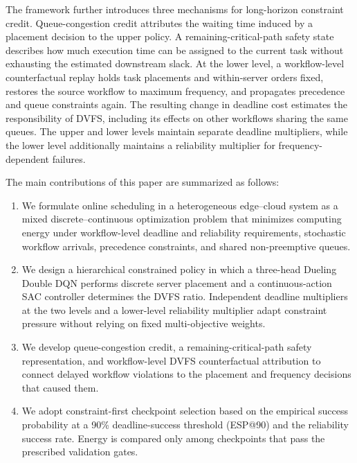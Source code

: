 \documentclass[lettersize,journal]{IEEEtran}
\begin{document}
The framework further introduces three mechanisms for long-horizon constraint
credit. Queue-congestion credit attributes the waiting time induced by a
placement decision to the upper policy. A remaining-critical-path safety state
describes how much execution time can be assigned to the current task without
exhausting the estimated downstream slack. At the lower level, a workflow-level
counterfactual replay holds task placements and within-server orders fixed,
restores the source workflow to maximum frequency, and propagates precedence
and queue constraints again. The resulting change in deadline cost estimates
the responsibility of DVFS, including its effects on other workflows sharing
the same queues. The upper and lower levels maintain separate deadline
multipliers, while the lower level additionally maintains a reliability
multiplier for frequency-dependent failures.

The main contributions of this paper are summarized as follows:
\begin{enumerate}
    \item We formulate online scheduling in a heterogeneous edge--cloud system
    as a mixed discrete--continuous optimization problem that minimizes
    computing energy under workflow-level deadline and reliability
    requirements, stochastic workflow arrivals, precedence constraints, and
    shared non-preemptive queues.

    \item We design a hierarchical constrained policy in which a three-head
    Dueling Double DQN performs discrete server placement and a continuous-action
    SAC controller determines the DVFS ratio. Independent deadline multipliers
    at the two levels and a lower-level reliability multiplier adapt constraint
    pressure without relying on fixed multi-objective weights.

    \item We develop queue-congestion credit, a remaining-critical-path safety
    representation, and workflow-level DVFS counterfactual attribution to
    connect delayed workflow violations to the placement and frequency
    decisions that caused them.

    \item We adopt constraint-first checkpoint selection based on the empirical
    success probability at a 90\% deadline-success threshold (ESP@90) and the
    reliability success rate. Energy is compared only among checkpoints that
    pass the prescribed validation gates.
\end{enumerate}
\end{document}
